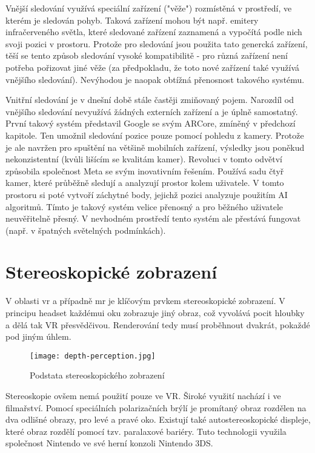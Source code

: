 Vnější sledování využívá speciální zařízení ("věže") rozmístěná v prostředí, ve kterém je sledován pohyb. Taková zařízení mohou být např. emitery infračerveného světla, které sledované zařízení zaznamená a vypočítá podle nich svoji pozici v prostoru. Protože pro sledování jsou použita tato genercká zařízení, těší se tento způsob sledování vysoké kompatibilitě - pro různá zařízení není potřeba pořizovat jiné věže (za předpokladu, že toto nové zařízení také využívá vnějšího sledování). Nevýhodou je naopak obtížná přenosnost takového systému. \cite{vr_tracking_suvi}

Vnitřní sledování je v dnešní době stále častěji zmiňovaný pojem. Narozdíl od vnějšího sledování nevyužívá žádných externích zařízení a je úplně samostatný. První takový systém představil Google se svým ARCore, zmíněný v předchozí kapitole. Ten umožnil sledování pozice pouze pomocí pohledu z kamery.  Protože je ale navržen pro spuštění na většině mobilních zařízení, výsledky jsou poněkud nekonzistentní (kvůli lišícím se kvalitám kamer).
Revoluci v tomto odvětví způsobila společnost Meta se svým inovativním řešením. Používá sadu čtyř kamer, které průběžně sledují a analyzují prostor kolem uživatele. V tomto prostoru si poté vytvoří záchytné body, jejichž pozici analyzuje použitím AI algoritmů. Tímto je takový systém velice přenosný a pro běžného uživatele neuvěřitelně přesný. V nevhodném prostředí tento systém ale přestává fungovat (např. v špatných světelných podmínkách). \cite{vr_tracking_suvi} \cite{enwiki:1182789097}

\section{Stereoskopické zobrazení}

V oblasti \gls{vr} a případně \gls{mr} je klíčovým prvkem stereoskopické zobrazení. V principu headset každémui oku zobrazuje jiný obraz, což vyvolává pocit hloubky a dělá tak VR přesvědčivou. Renderování tedy musí proběhnout dvakrát, pokaždé pod jiným úhlem. \cite{stereoskopie_diagram}

\begin{figure}[H]
    \centering
    \texttt{[image: depth-perception.jpg]}
    \caption{Podstata stereoskopického zobrazení \cite{stereoskopie_diagram}}
    \label{depth_perception}
\end{figure}

Stereoskopie ovšem nemá použití pouze ve VR. Široké využití nachází i ve filmařství. Pomocí speciálních polarizačních brýlí je promítaný obraz rozdělen na dva odlišné obrazy, pro levé a pravé oko. \cite{unitedfilm_stereoskopie} Existují také autostereoskopické displeje, které obraz rozdělí pomocí tzv. paralaxové bariéry. Tuto technologii využila společnost Nintendo ve své herní konzoli Nintendo 3DS. \cite{enwiki:1158939127}

